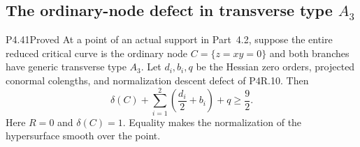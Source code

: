 \subsection{The ordinary-node defect in transverse type \texorpdfstring{$A_3$}{A3}}

\begin{statement}{P4.41}{Proved}
At a point of an actual support in Part~4.2, suppose the
entire reduced critical curve is the ordinary node
$C=\{z=xy=0\}$ and both branches have generic transverse
type $A_3$. Let $d_i,b_i,q$ be the Hessian zero orders,
projected conormal colengths, and normalization descent
defect of P4R.10. Then
\[
 \delta(C)+\sum_{i=1}^2\left(\frac{d_i}{2}+b_i\right)+q
                         \ge\frac92.                 \tag{4.41a}
\]
Here $R=0$ and $\delta(C)=1$. Equality makes the normalization
of the hypersurface smooth over the point.
\end{statement}
